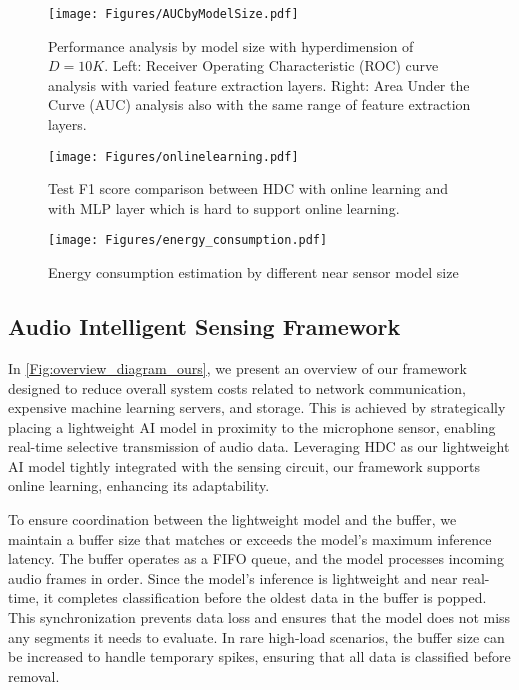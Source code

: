 \begin{figure*}
    \centering    \texttt{[image: Figures/AUCbyModelSize.pdf]}
    \caption{Performance analysis by model size with hyperdimension of $D=10K$. Left: Receiver Operating Characteristic (ROC) curve analysis with varied feature extraction layers. Right: Area Under the Curve (AUC) analysis also with the same range of feature extraction layers.}
    \label{fig:AUCbyModelSize}
\end{figure*}

\begin{figure}
    \centering    \texttt{[image: Figures/onlinelearning.pdf]}
    \caption{Test F1 score comparison between HDC with online learning and with MLP layer which is hard to support online learning.}
    \label{fig:onlinelearning}
\end{figure}

\begin{figure}
    \centering    \texttt{[image: Figures/energy\_consumption.pdf]}
    \caption{Energy consumption estimation by different near sensor model size}
    \label{fig:energy_consumption}
\end{figure}


\subsection{Audio Intelligent Sensing Framework}

In \autoref{Fig:overview_diagram_ours}, we present an overview of our framework designed to reduce overall system costs related to network communication, expensive machine learning servers, and storage. This is achieved by strategically placing a lightweight AI model in proximity to the microphone sensor, enabling real-time selective transmission of audio data. Leveraging HDC as our lightweight AI model tightly integrated with the sensing circuit, our framework supports online learning, enhancing its adaptability.

To ensure coordination between the lightweight model and the buffer, we maintain a buffer size that matches or exceeds the model's maximum inference latency. The buffer operates as a FIFO queue, and the model processes incoming audio frames in order. Since the model's inference is lightweight and near real-time, it completes classification before the oldest data in the buffer is popped. This synchronization prevents data loss and ensures that the model does not miss any segments it needs to evaluate. In rare high-load scenarios, the buffer size can be increased to handle temporary spikes, ensuring that all data is classified before removal.

